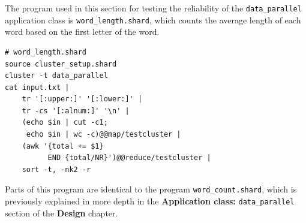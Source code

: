 \documentclass[twoside]{report}
\begin{document}
\begin{sloppypar}
  The program used in this section for testing the reliability of the \texttt{data\_parallel} application class is \texttt{word\_length.shard}, which counts the average length of each word based on the first letter of the word.
\end{sloppypar}
\begin{lstlisting}[language=Shard]
# word_length.shard
source cluster_setup.shard
cluster -t data_parallel
cat input.txt |
    tr '[:upper:]' '[:lower:]' |
    tr -cs '[:alnum:]' '\n' |
    (echo $in | cut -c1;
     echo $in | wc -c)@@map/testcluster |
    (awk '{total += $1}
          END {total/NR}')@@reduce/testcluster |
    sort -t, -nk2 -r
\end{lstlisting}

Parts of this program are identical to the program \texttt{word\_count.shard}, which is previously explained in more depth in the \textbf{Application class: }\texttt{data\_parallel} section of the \textbf{Design} chapter.
\end{document}
